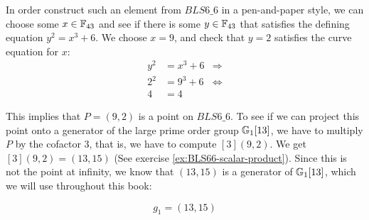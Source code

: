 In order construct such an element from $BLS6\_6$ in a pen-and-paper style, we can choose some $x\in\mathbb{F}_{43}$ and see if there is some $y\in\mathbb{F}_{43}$ that satisfies the defining  equation $y^2 = x^3 + 6$. We choose $x=9$, and check that $y=2$ satisfies the curve equation for $x$:
\begin{align*}
y^2 & = x^3 + 6 & \Rightarrow \\
2^2 & = 9^3 + 6 & \Leftrightarrow \\
4 & = 4
\end{align*}   

This implies that $P=(9,2)$ is a point on $BLS6\_6$. To see if we can project this point onto a generator of the large prime order group $\mathbb{G}_1[13]$, we have to multiply $P$ by the cofactor $3$, that is, we have to compute $[3](9,2)$. We get $[3](9,2) = (13,15)$ (See exercise \ref{ex:BLS66-scalar-product}). Since this is not the point at infinity, we know that $(13,15)$ is a generator of $\mathbb{G}_1[13]$, which we will use throughout this book: 

\begin{equation}\label{gBLS6-6-13}
g_{1} = (13,15)
\end{equation}

